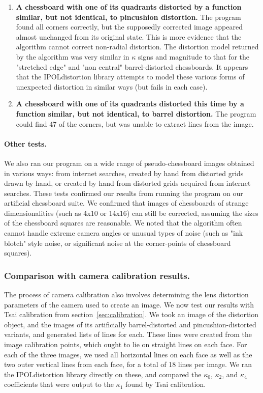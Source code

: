 \begin{enumerate}
  \item \textbf{A chessboard with one of its quadrants distorted by a function similar, but not identical, to pincushion distortion.} The program found all corners correctly, but the supposedly corrected image appeared almost unchanged from its original state. This is more evidence that the algorithm cannot correct non-radial distortion. The distortion model returned by the algorithm was very similar in $\kappa$ signs and magnitude to that for the "stretched edge" and "non central" barrel-distorted chessboards. It appears that the IPOLdistortion library attempts to model these various forms of unexpected distortion in similar ways (but fails in each case).
  \item \textbf{A chessboard with one of its quadrants distorted this time by a function similar, but not identical, to barrel distortion.} The program could find 47 of the corners, but was unable to extract lines from the image.
\end{enumerate}

\paragraph{Other tests.}
We also ran our program on a wide range of pseudo-chessboard images obtained in various ways: from internet searches, created by hand from distorted grids drawn by hand, or created by hand from distorted grids acquired from internet searches. These tests confirmed our results from running the program on our artificial chessboard suite. We confirmed that images of chessboards of strange dimensionalities (such as 4x10 or 14x16) can still be corrected, assuming the sizes of the chessboard squares are reasonable. We noted that the algorithm often cannot handle extreme camera angles or unusual types of noise (such as "ink blotch" style noise, or significant noise at the corner-points of chessboard squares).

\subsubsection{Comparison with camera calibration results.}

The process of camera calibration also involves determining the lens distortion parameters of the camera used to create an image. We now test our results with Tsai calibration from section~\ref{sec:calibration}. We took an image of the distortion object, and the images of its artificially barrel-distorted and pincushion-distorted variants, and generated lists of lines for each. These lines were created from the image calibration points, which ought to lie on straight lines on each face. For each of the three images, we used all horizontal lines on each face as well as the two outer vertical lines from each face, for a total of 18 lines per image. We ran the IPOLdistortion library directly on these, and compared the $\kappa_{0}$, $\kappa_{2}$, and $\kappa_{4}$ coefficients that were output to the $\kappa_{1}$ found by Tsai calibration.

